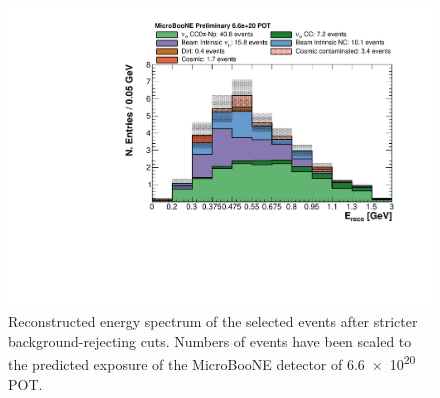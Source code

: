 \begin{figure}[htbp]
\centering
  \includegraphics[width=0.65\linewidth]{figures/hardcuts.pdf}
  \caption{Reconstructed energy spectrum of the selected events after stricter background-rejecting cuts. Numbers of events have been scaled to the predicted exposure of the MicroBooNE detector of \num{6.6e20} POT. }
  \label{fig:hardcuts}
\end{figure}